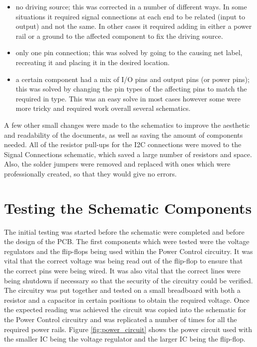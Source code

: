 \begin{itemize}
\item no driving source; this was corrected in a number of different ways. 
In some situations it required signal connections at each end to be related (input to output) and not the same. 
In other cases it required adding in either a power rail or a ground to the affected component to fix the driving source. 
\item only one pin connection; this was solved by going to the causing net label, recreating it and placing it in the desired location. 
\item a certain component had a mix of I/O pins and output pins (or power pins); this was solved by changing the pin types of the affecting pins to match the required in type. 
This was an easy solve in most cases however some were more tricky and required work overall several schematics. 
\end{itemize}

A few other small changes were made to the schematics to improve the aesthetic and readability of the documents, as well as saving the amount of components needed. 
All of the resistor pull-ups for the I2C connections were moved to the Signal Connections schematic, which saved a large number of resistors and space. 
Also, the solder jumpers were removed and replaced with ones which were professionally created, so that they would give no errors.


\section{Testing the Schematic Components}
\label{chap6sec2}

The initial testing was started before the schematic were completed and before the design of the PCB. 
The first components which were tested were the voltage regulators and the flip-flops being used within the Power Control circuitry. 
It was vital that the correct voltage was being read out of the flip-flop to ensure that the correct pins were being wired. 
It was also vital that the correct lines were being shutdown if necessary so that the security of the circuitry could be verified. 
The circuitry was put together and tested on a small breadboard with both a resistor and a capacitor in certain positions to obtain the required voltage. 
Once the expected reading was achieved the circuit was copied into the schematic for the Power Control circuitry and was replicated a number of times for all the required power rails. 
Figure \ref{fig:power_circuit} shows the power circuit used with the smaller IC being the voltage regulator and the larger IC being the flip-flop.

